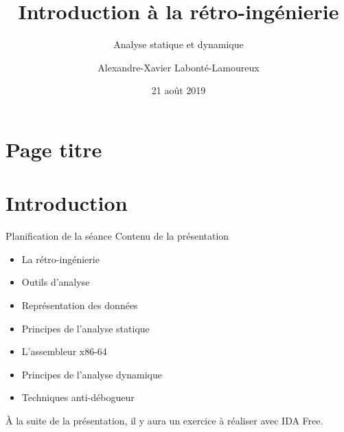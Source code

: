 \documentclass[10pt,xcolor={table,dvipsnames},t]{beamer}
\title[Your Short Title]{Introduction à la rétro-ingénierie}
\subtitle{Analyse statique et dynamique}
\author{Alexandre-Xavier Labonté-Lamoureux}
\institute{Délégation des compétitions en informatique de l'ÉTS}
\date{21 août 2019}
\begin{document}
\section{Page titre}

{

    \begin{frame}
        \titlepage
    \end{frame}
}


\section{Introduction}

\begin{frame}{Planification de la séance}
    Contenu de la présentation
    \begin{itemize}
        \item La rétro-ingénierie
        \item Outils d'analyse
        \item Représentation des données
        \item Principes de l'analyse statique
        \item L'assembleur x86-64
        \item Principes de l'analyse dynamique
        \item Techniques anti-débogueur
        \newline
    \end{itemize}
À la suite de la présentation, il y aura un exercice à réaliser avec IDA Free.


\end{frame}
\end{document}
